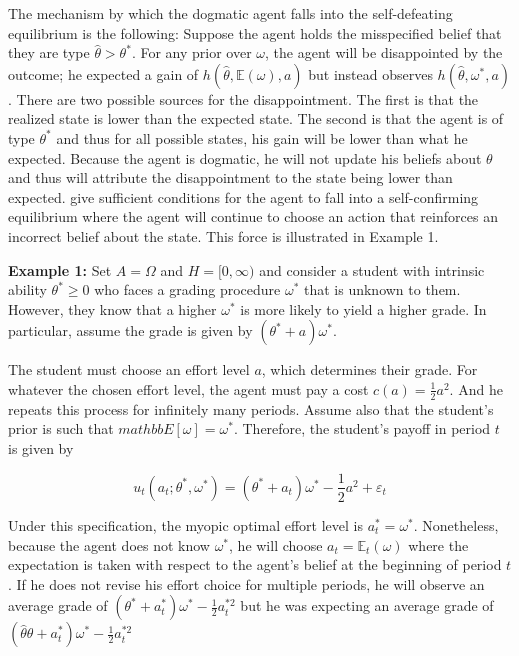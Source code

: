 \documentclass[
  12pt,
]{article}
\begin{document}
The mechanism by which the dogmatic agent falls into the self-defeating
equilibrium is the following: Suppose the agent holds the misspecified
belief that they are type \(\hat{\theta}>\theta^*\). For any prior over
\(\omega\), the agent will be disappointed by the outcome; he expected a
gain of \(h(\hat{\theta}, \mathbb{E}(\omega), a)\) but instead observes
\(h(\hat{\theta}, \omega^*, a)\). There are two possible sources for the
disappointment. The first is that the realized state is lower than the
expected state. The second is that the agent is of type \(\theta^*\) and
thus for all possible states, his gain will be lower than what he
expected. Because the agent is dogmatic, he will not update his beliefs
about \(\theta\) and thus will attribute the disappointment to the state
being lower than expected. \citet{Heidhues2018} give sufficient
conditions for the agent to fall into a self-confirming equilibrium
where the agent will continue to choose an action that reinforces an
incorrect belief about the state. This force is illustrated in Example
1.

\textbf{Example 1: } Set \(A = \Omega\) and \(H = [0, \infty)\) and
consider a student with intrinsic ability \(\theta^*\geq 0\) who faces a
grading procedure \(\omega^*\) that is unknown to them. However, they
know that a higher \(\omega^*\) is more likely to yield a higher grade.
In particular, assume the grade is given by \((\theta^*+a)\omega^*\).

The student must choose an effort level \(a\), which determines their
grade. For whatever the chosen effort level, the agent must pay a cost
\(c(a) = \frac{1}{2}a^2\). And he repeats this process for infinitely
many periods. Assume also that the student's prior is such that
\(mathbb{E}[\omega]= \omega^*\). Therefore, the student's payoff in
period \(t\) is given by

\begin{equation}
u_t(a_t; \theta^*, \omega^*) = (\theta^*+a_t)\omega^* - \frac{1}{2}a^2 + \varepsilon_t
\end{equation}

Under this specification, the myopic optimal effort level is
\(a_t^* = \omega^*\). Nonetheless, because the agent does not know
\(\omega^*\), he will choose \(a_t = \mathbb{E}_t(\omega)\) where the
expectation is taken with respect to the agent's belief at the beginning
of period \(t\). If he does not revise his effort choice for multiple
periods, he will observe an average grade of
\((\theta^*+a_t^*)\omega^* - \frac{1}{2}a_t^{*2}\) but he was expecting
an average grade of
\((\hat{\theta}\theta+a_t^*)\omega^* - \frac{1}{2}a_t^{*2}\)
\end{document}
